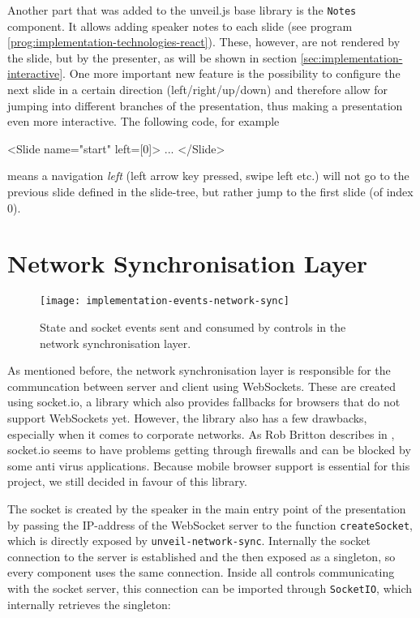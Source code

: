 Another part that was added to the unveil.js base library is the \texttt{Notes} component. It allows adding speaker notes to each slide (see program \ref{prog:implementation-technologies-react}). These, however, are not rendered by the slide, but by the presenter, as will be shown in section \ref{sec:implementation-interactive}. One more important new feature is the possibility to configure the next slide in a certain direction (left/right/up/down) and therefore allow for jumping into different branches of the presentation, thus making a presentation even more interactive. The following code, for example
%
\begin{JsCode}
  <Slide name="start" left={[0]}>
    ...
  </Slide>
\end{JsCode}
%
means a navigation \emph{left} (left arrow key pressed, swipe left etc.) will not go to the previous slide defined in the slide-tree, but rather jump to the first slide (of index $0$).

\section{Network Synchronisation Layer}
\label{sec:implementation-network-sync}

\begin{figure}
\centering
\texttt{[image: implementation-events-network-sync]}
\caption{State and socket events sent and consumed by controls in the network synchronisation layer.}
\label{fig:implementation-events-network-sync}
\end{figure}


As mentioned before, the network synchronisation layer is responsible for the communcation between server and client using WebSockets. These are created using socket.io, a library which also provides fallbacks for browsers that do not support WebSockets yet. However, the library also has a few drawbacks, especially when it comes to corporate networks. As Rob Britton describes in \cite{socketio-problems}, socket.io seems to have problems getting through firewalls and can be blocked by some anti virus applications.
Because mobile browser support is essential for this project, we still decided in favour of this library.

The socket is created by the speaker in the main entry point of the presentation by passing the IP-address of the WebSocket server to the function \texttt{createSocket}, which is directly exposed by \texttt{unveil-network-sync}. Internally the socket connection to the server is established and the then exposed as a singleton, so every component uses the same connection. Inside all controls communicating with the socket server, this connection can be imported through \texttt{SocketIO}, which internally retrieves the singleton:

